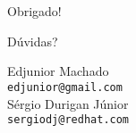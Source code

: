 \documentclass[xcolor=pdftex,dvipsnames,table,t]{beamer}
\begin{document}
\section{}
\begin{frame}
	\begin{center}
	\LARGE
	\alert{Obrigado!}

	Dúvidas?


	\vspace{2\baselineskip}

	\small
	Edjunior Machado \\
	{\tt edjunior@gmail.com} \\
	\vspace{1\baselineskip}
	Sérgio Durigan Júnior \\
	{\tt sergiodj@redhat.com}
	\end{center}
\end{frame}
\end{document}
